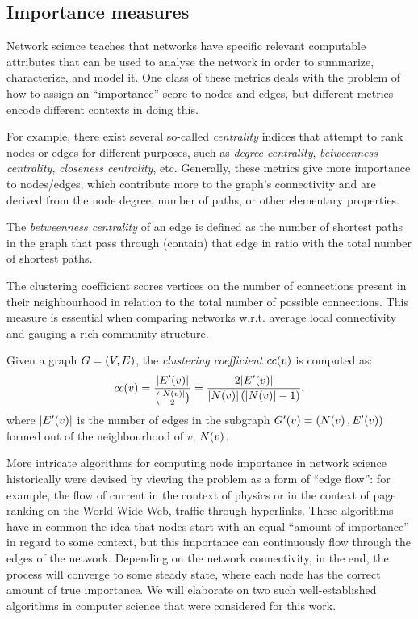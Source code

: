 \subsection{Importance measures}

Network science teaches that networks have specific relevant computable attributes that can be used to analyse the network in order to summarize, characterize, and model it. One class of these metrics deals with the problem of how to assign an \enquote{importance} score to nodes and edges, but different metrics encode different contexts in doing this.

For example, there exist several so-called \emph{centrality} indices that attempt to rank nodes or edges for different purposes, such as \emph{degree centrality}, \emph{betweenness centrality}, \emph{closeness centrality}, etc. Generally, these metrics give more importance to nodes/edges, which contribute more to the graph's connectivity and are derived from the node degree, number of paths, or other elementary properties.

\begin{definition}
The \emph{betweenness centrality} of an edge is defined as the number of shortest paths in the graph that pass through (contain) that edge in ratio with the total number of shortest paths.
\end{definition}

The clustering coefficient scores vertices on the number of connections present in their neighbourhood in relation to the total number of possible connections. This measure is essential when comparing networks w.r.t. average local connectivity and gauging a rich community structure.

\begin{definition}
Given a graph $G=\mathopen{}\left(V, E\right)$, the \emph{clustering coefficient} $cc\mathopen{}\left(v\right)$ is computed as: \begin{equation}
cc\mathopen{}\left(v\right)=\frac{\mathopen{}\left|E'\mathopen{}\left(v\right)\right|}{\binom{\mathopen{}\left|N\mathopen{}\left(v\right)\right|}{2}} = \frac{2\mathopen{}\left|E'\mathopen{}\left(v\right)\right|}{\mathopen{}\left|N\mathopen{}\left(v\right)\right|\mathopen{}\left(\mathopen{}\left|N\mathopen{}\left(v\right)\right|-1\right)},\end{equation}
where $\mathopen{}\left|E'\mathopen{}\left(v\right)\right|$ is the number of edges in the subgraph $G'\mathopen{}\left(v\right)=\mathopen{}\left(N\mathopen{}\left(v\right), E'\mathopen{}\left(v\right)\right)$ formed out of the neighbourhood of $v$, $N\mathopen{}\left(v\right)$.
\end{definition}

More intricate algorithms for computing node importance in network science historically were devised by viewing the problem as a form of \enquote{edge flow}: for example, the flow of current in the context of physics or in the context of page ranking on the World Wide Web, traffic through hyperlinks. These algorithms have in common the idea that nodes start with an equal \enquote{amount of importance} in regard to some context, but this importance can continuously flow through the edges of the network. Depending on the network connectivity, in the end, the process will converge to some steady state, where each node has the correct amount of true importance. We will elaborate on two such well-established algorithms in computer science that were considered for this work.

